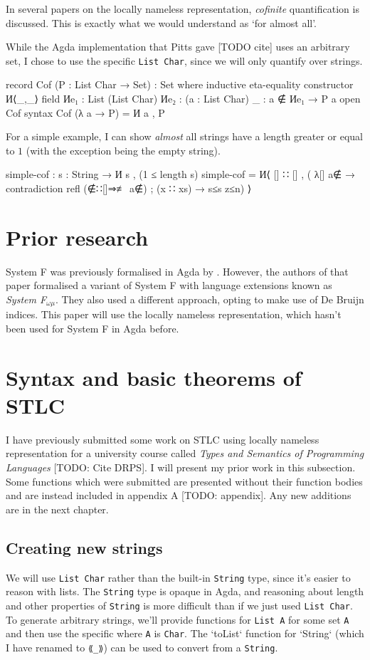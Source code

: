 \documentclass[logo,bsc,singlespacing,parskip,online]{infthesis}
\renewenvironment{code}{\mintedcopy[breaklines,breaksymbolleft=\;]{agda}}{\endmintedcopy}
\begin{document}
In several papers on the locally nameless representation, \textit{cofinite} quantification is
discussed. This is exactly what we would understand as `for almost all'.

While the Agda implementation that Pitts gave [TODO cite] uses an arbitrary set, I chose to use the
specific \texttt{List Char}, since we will only quantify over strings.

\begin{code}
record Cof (P : List Char → Set) : Set where
  inductive
  eta-equality
  constructor И⟨_,_⟩
  field
    Иe₁ : List (List Char)
    Иe₂ : (a : List Char) {_ : a ∉ Иe₁} → P a
open Cof
syntax Cof (λ a → P) = И a , P
\end{code}

For a simple example, I can show \textit{almost} all strings have a length greater or equal to $1$
(with the exception being the empty string).

\begin{code}
simple-cof : {s : String} → И s , (1 ≤ length s)
simple-cof = И⟨ [] ∷ [] , (
  λ{[] {a∉}  → contradiction refl (∉∷[]⇒≢ a∉)
  ; (x ∷ xs) → s≤s z≤n}) ⟩
\end{code}

\section{Prior research}
System F was previously formalised in Agda by \citet{hutton_system_2019}. However, the authors of that paper formalised a
variant of System F with language extensions known as \textit{System F$_{\omega \mu}$}. They also
used a different approach, opting to make use of De Bruijn indices. This paper will use the locally
nameless representation, which hasn't been used for System F in Agda before.

\section{Syntax and basic theorems of STLC}
I have previously submitted some work on STLC using locally nameless representation for a university
course called \textit{Types and Semantics of Programming Languages} [TODO: Cite DRPS]. I will
present my prior work in this subsection. Some functions which were submitted are presented without their
function bodies and are instead included in appendix A [TODO: appendix]. Any new additions are in
the next chapter.

\subsection{Creating new strings}
We will use \texttt{List Char} rather than the built-in \texttt{String} type, since it's easier to
reason with lists. The \texttt{String} type is opaque in Agda, and reasoning about length and other
properties of \texttt{String} is more difficult than if we just used \texttt{List Char}. To generate
arbitrary strings, we'll provide functions for \texttt{List A} for some set \texttt{A} and then use
the specific where \texttt{A} is \texttt{Char}. The `toList` function for `String` (which I have
renamed to \texttt{⟪\_⟫}) can be used to convert from a \texttt{String}.
\end{document}
